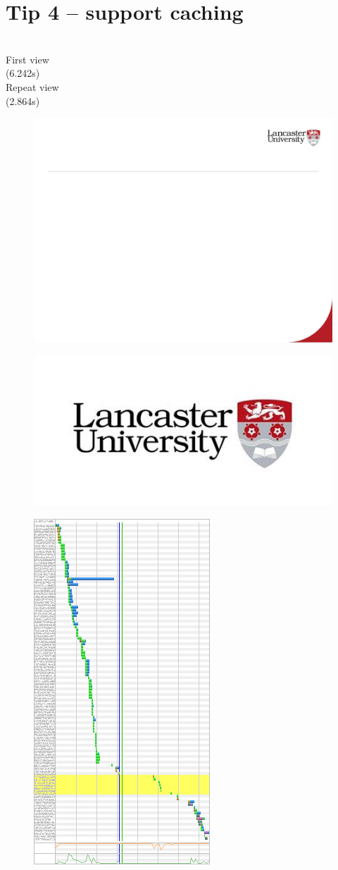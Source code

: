 \documentclass[12pt]{article}
\begin{document}
\section{Tip 4 – support caching}
\\
First view\\
(6.242s)\\
Repeat view\\
(2.864s)\\
\begin{figure}[H]
\includegraphics[width=0.5\linewidth]{page55-image-1.png}
\end{figure}
\begin{figure}[H]
\includegraphics[width=0.5\linewidth]{page55-image-2.png}
\end{figure}
\begin{figure}[H]
\includegraphics[width=0.5\linewidth]{page55-image-3.png}
\end{figure}
\end{document}
